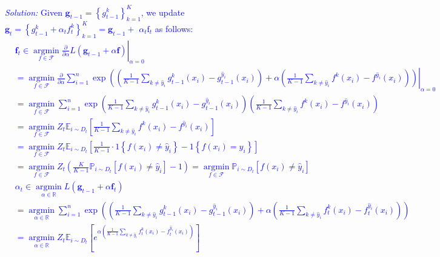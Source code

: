 \documentclass{article}
\def\solColor{blue}
\begin{document}
\textcolor{\solColor}{\textit{Solution:}
Given $\mathbf{g}_{t-1}=\left\{g_{t-1}^k\right\}_{k=1}^K$, we update $\mathbf{g}_t=\left\{g_{t-1}^k+\alpha_t f_t^k\right\}_{k=1}^K=\mathbf{g}_{t-1}+$ $\alpha_t \mathrm{f}_t$ as follows:
$$
\begin{aligned}
& \left.\mathbf{f}_t \in \underset{f \in \mathcal{F}}{\operatorname{argmin}} \frac{\partial}{\partial \alpha} L\left(\mathbf{g}_{t-1}+\alpha \mathbf{f}\right)\right|_{\alpha=0} \\
& =\left.\underset{f \in \mathcal{F}}{\operatorname{argmin}} \frac{\partial}{\partial \alpha} \sum_{i=1}^n \exp \left(\left(\frac{1}{K-1} \sum_{k \neq \hat{y}_i} g_{t-1}^k\left(x_i\right)-g_{t-1}^{\hat{y}_i}\left(x_i\right)\right)+\alpha\left(\frac{1}{K-1} \sum_{k \neq \hat{y}_i} f^k\left(x_i\right)-f^{\hat{y}_i}\left(x_i\right)\right)\right)\right|_{\alpha=0} \\
& =\underset{f \in \mathcal{F}}{\operatorname{argmin}} \sum_{i=1}^n \exp \left(\frac{1}{K-1} \sum_{k \neq \hat{y}_i} g_{t-1}^k\left(x_i\right)-g_{t-1}^{\hat{y}_i}\left(x_i\right)\right)\left(\frac{1}{K-1} \sum_{k \neq \hat{y}_i} f^k\left(x_i\right)-f^{\hat{y}_i}\left(x_i\right)\right) \\
& =\underset{f \in \mathcal{F}}{\operatorname{argmin}} Z_t \mathbb{E}_{i \sim D_t}\left[\frac{1}{K-1} \sum_{k \neq \hat{y}_i} f^k\left(x_i\right)-f^{\hat{y}_i}\left(x_i\right)\right]\\
&=\underset{f \in \mathcal{F}}{\operatorname{argmin}} Z_t \mathbb{E}_{i \sim D_t}\left[\frac{1}{K-1} \cdot 1\left\{f\left(x_i\right) \neq \hat{y}_i\right\}-1\left\{f\left(x_i\right)=\hat{y}_i\right\}\right] \\
& =\underset{f \in \mathcal{F}}{\operatorname{argmin}} Z_t\left(\frac{K}{K-1} \mathbb{P}_{i \sim D_t}\left[f\left(x_i\right) \neq \hat{y}_i\right]-1\right)=\underset{f \in \mathcal{F}}{\operatorname{argmin}} \mathbb{P}_{i \sim D_t}\left[f\left(x_i\right) \neq \hat{y}_i\right] \\
& \alpha_t\in \underset{\alpha \in \mathbb{R}}{\operatorname{argmin}} L\left(\mathbf{g}_{t-1}+\alpha \mathbf{f}_t\right) \\
& =\underset{\alpha \in \mathbb{R}}{\operatorname{argmin}} \sum_{i=1}^n \exp \left(\left(\frac{1}{K-1} \sum_{k \neq \hat{y}_i} g_{t-1}^k\left(x_i\right)-g_{t-1}^{\hat{y}_i}\left(x_i\right)\right)+\alpha\left(\frac{1}{K-1} \sum_{k \neq \hat{y}_i} f_t^k\left(x_i\right)-f_t^{\hat{y}_i}\left(x_i\right)\right)\right) \\
& =\underset{\alpha \in \mathbb{R}}{\operatorname{argmin}} Z_t \mathbb{E}_{i \sim D_t}\left[e^{\alpha\left(\frac{1}{K-1} \sum_{k \neq \hat{y}_i} f_t^k\left(x_i\right)-f_t^{\hat{y}_i}\left(x_i\right)\right)}\right] \\

\end{aligned}$$}
\end{document}
